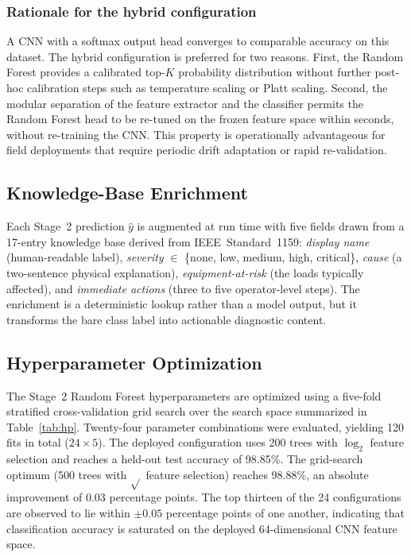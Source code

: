 \documentclass[conference]{IEEEtran}
\begin{document}
\subsubsection{Rationale for the hybrid configuration}
A CNN with a softmax output head converges to comparable accuracy on
this dataset. The hybrid configuration is preferred for two reasons.
First, the Random Forest provides a calibrated top-$K$ probability
distribution without further post-hoc calibration steps such as
temperature scaling or Platt scaling. Second, the modular separation
of the feature extractor and the classifier permits the Random Forest
head to be re-tuned on the frozen feature space within seconds,
without re-training the CNN. This property is operationally
advantageous for field deployments that require periodic drift
adaptation or rapid re-validation.

\subsection{Knowledge-Base Enrichment}\label{sec:kb}
Each Stage~2 prediction $\hat{y}$ is augmented at run time with five
fields drawn from a 17-entry knowledge base derived from
IEEE~Standard~1159: \emph{display name} (human-readable label),
\emph{severity} $\in$ \{none, low, medium, high, critical\},
\emph{cause} (a two-sentence physical explanation),
\emph{equipment-at-risk} (the loads typically affected), and
\emph{immediate actions} (three to five operator-level steps). The
enrichment is a deterministic lookup rather than a model output, but
it transforms the bare class label into actionable diagnostic content.

\subsection{Hyperparameter Optimization}
The Stage~2 Random Forest hyperparameters are optimized using a
five-fold stratified cross-validation grid search over the search
space summarized in Table~\ref{tab:hp}. Twenty-four parameter
combinations were evaluated, yielding 120 fits in total
($24 \times 5$). The deployed configuration uses 200 trees with
$\log_2$ feature selection and reaches a held-out test accuracy of
98.85\%. The grid-search optimum (500 trees with $\sqrt{}$ feature
selection) reaches 98.88\%, an absolute improvement of 0.03
percentage points. The top thirteen of the 24 configurations are
observed to lie within $\pm 0.05$ percentage points of one another,
indicating that classification accuracy is saturated on the deployed
64-dimensional CNN feature space.
\end{document}
